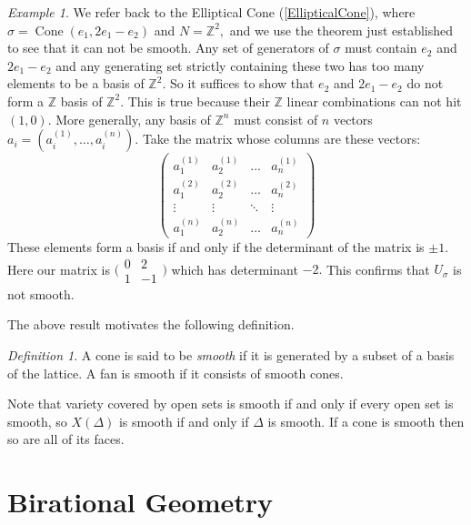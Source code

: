 \documentclass[BSc]{usydthesis}
\numberwithin{equation}{chapter}
\theoremstyle{remark}
\newtheorem{Definition}[equation]{Definition}
\newtheorem{Example}[equation]{Example}
\newcommand{\Z}{\mathbb{Z}}
\DeclareMathOperator{\Cone}{Cone}
\begin{document}
\begin{Example}
 We refer back to the Elliptical Cone (\ref{EllipticalCone}), where $\sigma = \Cone(e_1, 2e_1-e_2)$ and $N=\Z^2,$ and we use the theorem just established to see that it can not be smooth. Any set of generators of $\sigma$ must contain $e_2$ and $2e_1-e_2$ and any generating set strictly containing these two has too many elements to be a basis of $\Z^2.$ So it suffices to show that $e_2$ and $2e_1-e_2$ do not form a $\Z$ basis of $\Z^2.$ This is true because their $\Z$ linear combinations can not hit $(1,0).$ More generally, any basis of $\Z^n$ must consist of $n$ vectors $a_i = (a_i^{(1)}, \ldots, a_i^{(n)}).$ Take the matrix whose columns are these vectors:
   $$
\begin{pmatrix}
a_1^{(1)} &  a_2^{(1)}  & \ldots & a_n^{(1)}\\
a_1^{(2)}  &  a_2^{(2)} & \ldots & a_n^{(2)}\\
\vdots & \vdots & \ddots & \vdots\\
a_1^{(n)}  &   a_2^{(n)}       &\ldots & a_n^{(n)}
\end{pmatrix}
$$
These elements form a basis if and only if the determinant of the matrix is $\pm 1.$ Here our matrix is $\bigl(\begin{smallmatrix}
0&2\\ 1&-1
\end{smallmatrix} \bigr)$ which has determinant $-2.$ This confirms that $U_{\sigma}$ is not smooth. 
\end{Example}

The above result motivates the following definition.
\begin{Definition}
 A cone is said to be {\em smooth} if it is generated by a subset of a basis of the lattice. A fan is smooth if it consists of smooth cones.
\end{Definition}

Note that variety covered by open sets is smooth if and only if every open set is smooth, so $X(\Delta)$ is smooth if and only if $\Delta$ is smooth. If a cone is smooth then so are all of its faces.




\section{Birational Geometry}
\end{document}
